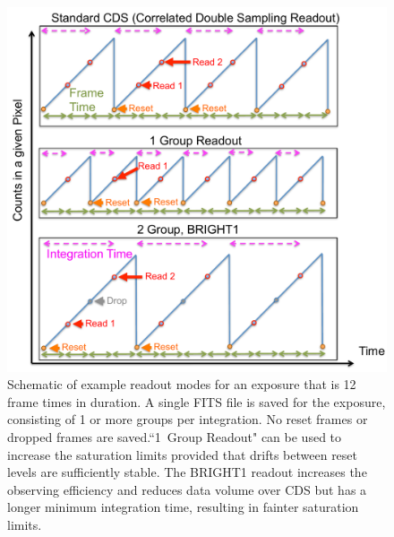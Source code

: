 \documentclass[iop]{emulateapj}
\begin{document}
\begin{figure}[t]
\centering
\includegraphics[width=1.0\columnwidth]{readout_schematic.pdf}
\caption{Schematic of example readout modes for an exposure that is 12 frame times in duration.
A single FITS file is saved for the exposure, consisting of 1 or more groups per integration.
No reset frames or dropped frames are saved.``1~Group Readout" can be used to increase the saturation limits provided that drifts between reset levels are sufficiently stable.
The BRIGHT1 readout increases the observing efficiency and reduces data volume over CDS but has a longer minimum integration time, resulting in fainter saturation limits.}\label{fig:readout}
\end{figure}
\end{document}
